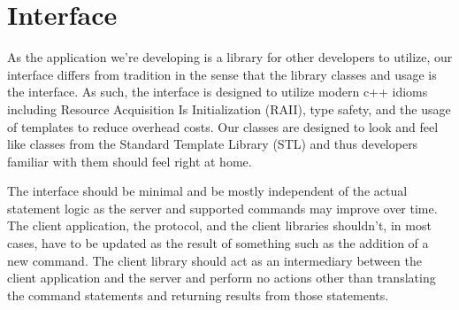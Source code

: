 \documentclass[a4paper]{report}
\begin{document}
\section{Interface}

	As the application we’re developing is a library for other developers to utilize, our interface differs from tradition in the sense that the library classes and usage is the interface. As such, the interface is designed to utilize modern c++ idioms including Resource Acquisition Is Initialization (RAII), type safety, and the usage of templates to reduce overhead costs. Our classes are designed to look and feel like classes from the Standard Template Library (STL) and thus developers familiar with them should feel right at home.

	The interface should be minimal and be mostly independent of the actual statement logic as the server and supported commands may improve over time. The client application, the protocol, and the client libraries shouldn’t, in most cases, have to be updated as the result of something such as the addition of a new command. The client library should act as an intermediary between the client application and the server and perform no actions other than translating the command statements and returning results from those statements.
\end{document}
